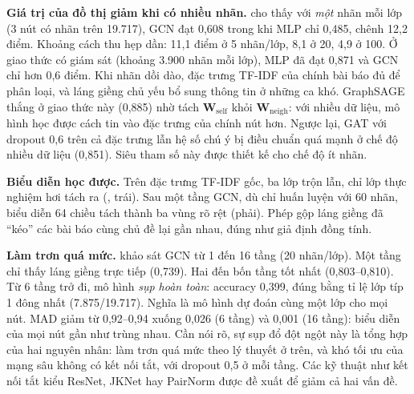 
\textbf{Giá trị của đồ thị giảm khi có nhiều nhãn.}  cho thấy với \emph{một} nhãn mỗi lớp (3 nút có nhãn trên 19.717), GCN đạt 0,608 trong khi MLP chỉ 0,485, chênh 12,2 điểm. Khoảng cách thu hẹp dần: 11,1 điểm ở 5 nhãn/lớp, 8,1 ở 20, 4,9 ở 100. Ở giao thức có giám sát (khoảng 3.900 nhãn mỗi lớp), MLP đã đạt 0,871 và GCN chỉ hơn 0,6 điểm. Khi nhãn dồi dào, đặc trưng TF-IDF của chính bài báo đủ để phân loại, và láng giềng chủ yếu bổ sung thông tin ở những ca khó. GraphSAGE thắng ở giao thức này (0,885) nhờ tách $\mathbf W_{\text{self}}$ khỏi $\mathbf W_{\text{neigh}}$: với nhiều dữ liệu, mô hình học được cách tin vào đặc trưng của chính nút hơn. Ngược lại, GAT với dropout 0,6 trên cả đặc trưng lẫn hệ số chú ý bị điều chuẩn quá mạnh ở chế độ nhiều dữ liệu (0,851). Siêu tham số này được thiết kế cho chế độ ít nhãn.


\textbf{Biểu diễn học được.} Trên đặc trưng TF-IDF gốc, ba lớp trộn lẫn, chỉ lớp thực nghiệm hơi tách ra (, trái). Sau một tầng GCN, dù chỉ huấn luyện với 60 nhãn, biểu diễn 64 chiều tách thành ba vùng rõ rệt (phải). Phép gộp láng giềng đã ``kéo'' các bài báo cùng chủ đề lại gần nhau, đúng như giả định đồng tính.


\textbf{Làm trơn quá mức.}  khảo sát GCN từ 1 đến 16 tầng (20 nhãn/lớp). Một tầng chỉ thấy láng giềng trực tiếp (0,739). Hai đến bốn tầng tốt nhất (0,803–0,810). Từ 6 tầng trở đi, mô hình \emph{sụp hoàn toàn}: accuracy 0,399, đúng bằng tỉ lệ lớp típ 1 đông nhất (7.875/19.717). Nghĩa là mô hình dự đoán cùng một lớp cho mọi nút. MAD giảm từ 0,92–0,94 xuống 0,026 (6 tầng) và 0,001 (16 tầng): biểu diễn của mọi nút gần như trùng nhau. Cần nói rõ, sự sụp đổ đột ngột này là tổng hợp của hai nguyên nhân: làm trơn quá mức theo lý thuyết ở trên, và khó tối ưu của mạng sâu không có kết nối tắt, với dropout 0,5 ở mỗi tầng. Các kỹ thuật như kết nối tắt kiểu ResNet, JKNet hay PairNorm được đề xuất để giảm cả hai vấn đề.


